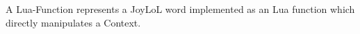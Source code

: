 
\startsection[title=Goals]

A Lua-Function represents a JoyLoL word implemented as an Lua function 
which directly manipulates a Context. 